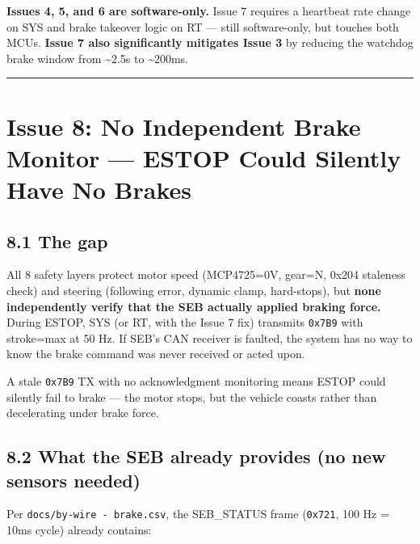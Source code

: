 \documentclass[12pt,a4paper,oneside]{report}
\begin{document}
\textbf{Issues 4, 5, and 6 are software-only.} Issue 7 requires a heartbeat rate
change on SYS and brake takeover logic on RT --- still software-only, but
touches both MCUs. \textbf{Issue 7 also significantly mitigates Issue 3} by
reducing the watchdog brake window from \textasciitilde2.5s to
\textasciitilde200ms.

\begin{center}\rule{0.5\linewidth}{0.5pt}\end{center}

\section{Issue 8: No Independent Brake Monitor --- ESTOP Could Silently Have No
Brakes}\label{issue-8-no-independent-brake-monitor-estop-could-silently-have-no-brakes}

\subsection{8.1 The gap}\label{the-gap-1}

All 8 safety layers protect motor speed (MCP4725=0V, gear=N, 0x204 staleness
check) and steering (following error, dynamic clamp, hard-stops), but
\textbf{none independently verify that the SEB actually applied braking force.}
During ESTOP, SYS (or RT, with the Issue 7 fix) transmits \texttt{0x7B9} with
stroke=max at 50 Hz. If SEB's CAN receiver is faulted, the system has no way to
know the brake command was never received or acted upon.

A stale \texttt{0x7B9} TX with no acknowledgment monitoring means ESTOP could
silently fail to brake --- the motor stops, but the vehicle coasts rather than
decelerating under brake force.

\subsection{8.2 What the SEB already provides (no new sensors
needed)}\label{what-the-seb-already-provides-no-new-sensors-needed}

Per \texttt{docs/by-wire\ -\ brake.csv}, the SEB\_STATUS frame (\texttt{0x721},
100 Hz = 10ms cycle) already contains:
\end{document}
